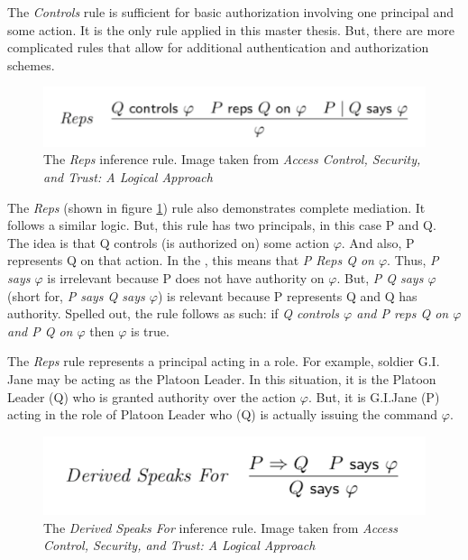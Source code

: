 \documentclass[../../main/main.tex]{subfiles}
\begin{document}
The \textit{Controls} rule is sufficient for basic authorization involving one principal and some action.  It is the only rule applied in this master thesis.  But, there are more complicated rules that allow for additional authentication and authorization schemes.  

\begin{figure}[h]
\centering
\includegraphics[width =0.7 \textwidth]{../figures/repsrule}
\caption{\label{repsrule}The \textit{Reps} inference rule. Image taken from \textit{Access Control, Security, and Trust: A Logical Approach}\cite{ChinOlder}}
\end{figure}

The \textit{Reps} (shown in figure \ref{repsrule}) rule also demonstrates complete mediation.  It follows a similar logic.  But, this rule has two principals, in this case P and Q.  The idea is that Q controls (is authorized on) some action $\varphi$. And also, P represents Q on that action.  In the , this means that \textit{P Reps Q on $\varphi$}.  Thus, \textit{P says $\varphi$} is irrelevant because P does not have authority on $\varphi$.  But, \textit{P \textbar Q says $\varphi$} (short for, \textit{P says Q says $\varphi$}) is relevant because P represents Q and Q has authority.  Spelled out, the rule follows as such: if \textit{Q controls $\varphi$ and P reps Q on $\varphi$ and P \textbar Q on $\varphi$} then $\varphi$ is true.

The \textit{Reps} rule represents a principal acting in a role.  For example, soldier G.I. Jane may be acting as the Platoon Leader.  In this situation, it is the Platoon Leader (Q) who is granted authority over the action $\varphi$.  But, it is G.I.Jane (P) acting in the role of Platoon Leader who (Q) is actually issuing the command $\varphi$.  

\begin{figure}[h]
\centering
\includegraphics[width =0.6 \textwidth]{../figures/derivedspeaksfor}
\caption{\label{derivedspeaksfor}The \textit{Derived Speaks For} inference rule. Image taken from \textit{Access Control, Security, and Trust: A Logical Approach}\cite{ChinOlder}}
\end{figure}
\end{document}
